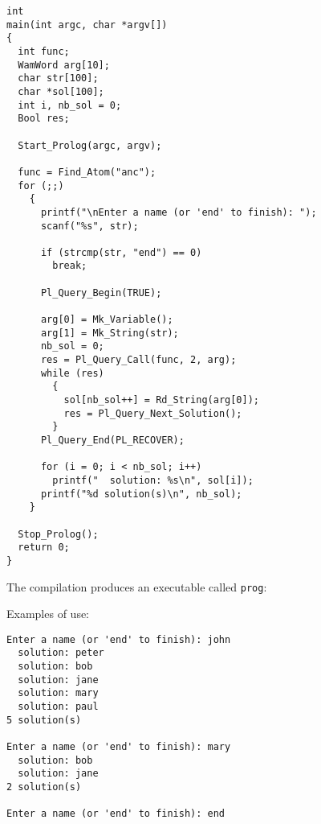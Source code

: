 \begin{Indentation}
\begin{verbatim}
int
main(int argc, char *argv[])
{
  int func;
  WamWord arg[10];
  char str[100];
  char *sol[100];
  int i, nb_sol = 0;
  Bool res;

  Start_Prolog(argc, argv);

  func = Find_Atom("anc");
  for (;;)
    {
      printf("\nEnter a name (or 'end' to finish): ");
      scanf("%s", str);

      if (strcmp(str, "end") == 0)
        break;

      Pl_Query_Begin(TRUE);

      arg[0] = Mk_Variable();
      arg[1] = Mk_String(str);
      nb_sol = 0;
      res = Pl_Query_Call(func, 2, arg);
      while (res)
        {
          sol[nb_sol++] = Rd_String(arg[0]);
          res = Pl_Query_Next_Solution();
        }
      Pl_Query_End(PL_RECOVER);

      for (i = 0; i < nb_sol; i++)
        printf("  solution: %s\n", sol[i]);
      printf("%d solution(s)\n", nb_sol);
    }

  Stop_Prolog();
  return 0;
}
\end{verbatim}
\end{Indentation}

The compilation produces an executable called \texttt{prog}:


Examples of use:

\begin{Indentation}
\begin{verbatim}
Enter a name (or 'end' to finish): john
  solution: peter
  solution: bob
  solution: jane
  solution: mary
  solution: paul
5 solution(s)

Enter a name (or 'end' to finish): mary
  solution: bob
  solution: jane
2 solution(s)

Enter a name (or 'end' to finish): end
\end{verbatim}
\end{Indentation}

